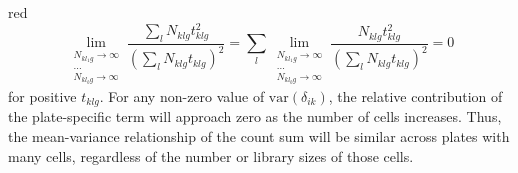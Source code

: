 \documentclass{article}
\begin{document}
\begin{color}{red}
\[
    \lim_{\substack{N_{kl_1g} \to \infty \\ \dots \\ N_{kl_bg} \to \infty}} \frac{\sum_{l} N_{klg} t_{klg}^2}{ (\sum_{l} N_{klg} t_{klg})^2} 
    = \sum_{l} \lim_{\substack{N_{kl_1g} \to \infty \\ \dots \\ N_{kl_bg} \to \infty}} \frac{N_{klg} t_{klg}^2}{ (\sum_{l} N_{klg} t_{klg})^2} 
= 0
\]
for positive $t_{klg}$.
For any non-zero value of $\mbox{var}(\delta_{ik})$, the relative contribution of the plate-specific term will approach zero as the number of cells increases.
Thus, the mean-variance relationship of the count sum will be similar across plates with many cells, regardless of the number or library sizes of those cells.
\end{color}



\end{document}
